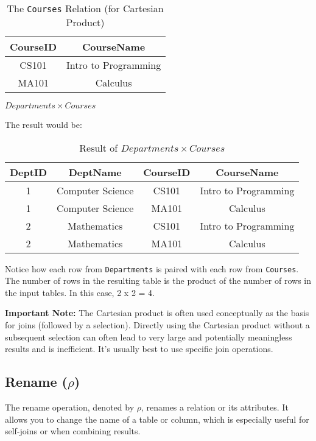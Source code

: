 \documentclass[12pt]{book}
\begin{document}
\begin{table}[htbp]
\centering
\begin{tabular}{@{}cc@{}}
\toprule
CourseID & CourseName \\
\midrule
CS101 & Intro to Programming \\
MA101 & Calculus \\
\bottomrule
\end{tabular}
\caption{The \texttt{Courses} Relation (for Cartesian Product)}
\label{tab:courses_cartesian}
\end{table}

$\mathit{Departments} \times \mathit{Courses}$

The result would be:

\begin{table}[htbp]
\centering
\begin{tabular}{@{}cccc@{}}
\toprule
DeptID & DeptName & CourseID & CourseName \\
\midrule
1 & Computer Science & CS101 & Intro to Programming \\
1 & Computer Science & MA101 & Calculus \\
2 & Mathematics & CS101 & Intro to Programming \\
2 & Mathematics & MA101 & Calculus \\
\bottomrule
\end{tabular}
\caption{Result of $\mathit{Departments} \times \mathit{Courses}$}
\label{tab:cartesian_result}
\end{table}

Notice how each row from \texttt{Departments} is paired with each row from \texttt{Courses}. The number of rows in the resulting table is the product of the number of rows in the input tables. In this case, 2 x 2 = 4.

\textbf{Important Note:} The Cartesian product is often used conceptually as the basis for joins (followed by a selection). Directly using the Cartesian product without a subsequent selection can often lead to very large and potentially meaningless results and is inefficient. It's usually best to use specific join operations.

\subsection{Rename ($\rho$)}

The rename operation, denoted by $\rho$, renames a relation or its attributes. It allows you to change the name of a table or column, which is especially useful for self-joins or when combining results.
\end{document}
